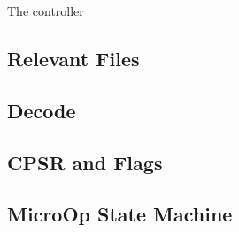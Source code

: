 The controller

\subsection{Relevant Files}

\subsection{Decode}

\subsection{CPSR and Flags}

\subsection{MicroOp State Machine}